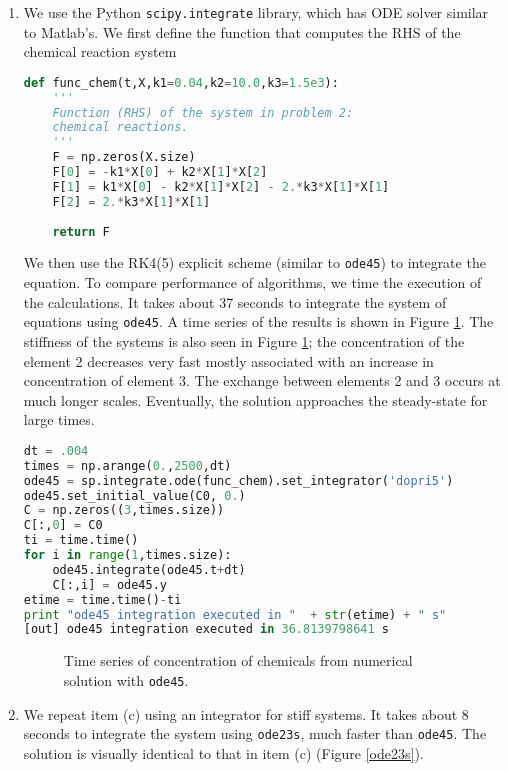 \documentclass[11pt]{article}
\begin{document}
\begin{enumerate}[label=(\alph*)]
\item We use the Python \texttt{scipy.integrate} library, which has ODE solver similar to Matlab's. We first define the function that computes the RHS of the chemical reaction system

\begin{lstlisting}[language=Python]
def func_chem(t,X,k1=0.04,k2=10.0,k3=1.5e3):
    '''
    Function (RHS) of the system in problem 2:
    chemical reactions.
    '''
    F = np.zeros(X.size)
    F[0] = -k1*X[0] + k2*X[1]*X[2]
    F[1] = k1*X[0] - k2*X[1]*X[2] - 2.*k3*X[1]*X[1]
    F[2] = 2.*k3*X[1]*X[1]
    
    return F
\end{lstlisting}

We then use the RK4(5) explicit scheme (similar to \texttt{ode45}) to integrate the equation. To compare performance of algorithms, we time the execution of the calculations. It takes about 37 seconds to integrate the system of equations using \texttt{ode45}. A time series of the results is shown in Figure \ref{ode45}. The stiffness of the systems is also seen in Figure \ref{ode45}; the concentration of the element 2 decreases very fast mostly associated with an increase in concentration of element 3. The exchange between elements 2 and 3 occurs at much longer scales. Eventually, the solution approaches the steady-state for large times.

\begin{lstlisting}[language=Python]
dt = .004
times = np.arange(0.,2500,dt)
ode45 = sp.integrate.ode(func_chem).set_integrator('dopri5')
ode45.set_initial_value(C0, 0.)
C = np.zeros((3,times.size))
C[:,0] = C0
ti = time.time()
for i in range(1,times.size):
    ode45.integrate(ode45.t+dt)
    C[:,i] = ode45.y
etime = time.time()-ti
print "ode45 integration executed in "  + str(etime) + " s"
[out] ode45 integration executed in 36.8139798641 s
\end{lstlisting}


\begin{figure}[p]
\centerline{}
\caption{Time series of concentration of chemicals from numerical solution with \texttt{ode45}.}
    \label{ode45}
\end{figure}

\item We repeat item (c) using an integrator for stiff systems. It takes about 8 seconds to integrate the system using \texttt{ode23s}, much faster than  \texttt{ode45}. The solution is visually identical to that in item (c) (Figure \ref{ode23s}).


\end{enumerate}
\end{document}
